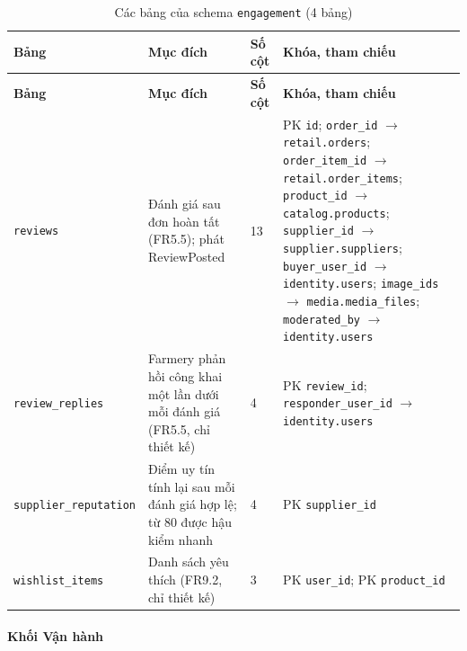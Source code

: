 \begingroup
\tblsetup\footnotesize\renewcommand{\arraystretch}{1.1}
\begin{longtable}{L{3.20cm} L{5.60cm} L{1.10cm} L{5.00cm}}
\caption{Các bảng của schema \texttt{engagement} (4 bảng)}
\label{tab:db-engagement} \\
\toprule
{}
\textbf{Bảng} & \textbf{Mục đích} & \textbf{Số cột} & \textbf{Khóa, tham chiếu} \\
\midrule
\endfirsthead
\toprule
{}
\textbf{Bảng} & \textbf{Mục đích} & \textbf{Số cột} & \textbf{Khóa, tham chiếu} \\
\midrule
\endhead
\bottomrule
\endfoot
\texttt{reviews} & Đánh giá sau đơn hoàn tất (FR5.5); phát ReviewPosted & 13 & PK \texttt{id}; \texttt{order\_\allowbreak{}id} $\to$ \texttt{retail.orders}; \texttt{order\_\allowbreak{}item\_\allowbreak{}id} $\to$ \texttt{retail.order\_\allowbreak{}items}; \texttt{product\_\allowbreak{}id} $\to$ \texttt{catalog.products}; \texttt{supplier\_\allowbreak{}id} $\to$ \texttt{supplier.suppliers}; \texttt{buyer\_\allowbreak{}user\_\allowbreak{}id} $\to$ \texttt{identity.users}; \texttt{image\_\allowbreak{}ids} $\to$ \texttt{media.media\_\allowbreak{}files}; \texttt{moderated\_\allowbreak{}by} $\to$ \texttt{identity.users} \\
\texttt{review\_\allowbreak{}replies} & Farmery phản hồi công khai một lần dưới mỗi đánh giá (FR5.5, chỉ thiết kế) & 4 & PK \texttt{review\_\allowbreak{}id}; \texttt{responder\_\allowbreak{}user\_\allowbreak{}id} $\to$ \texttt{identity.users} \\
\texttt{supplier\_\allowbreak{}reputation} & Điểm uy tín tính lại sau mỗi đánh giá hợp lệ; từ 80 được hậu kiểm nhanh & 4 & PK \texttt{supplier\_\allowbreak{}id} \\
\texttt{wishlist\_\allowbreak{}items} & Danh sách yêu thích (FR9.2, chỉ thiết kế) & 3 & PK \texttt{user\_\allowbreak{}id}; PK \texttt{product\_\allowbreak{}id} \\
\end{longtable}
\endgroup

\paragraph*{Khối Vận hành}

